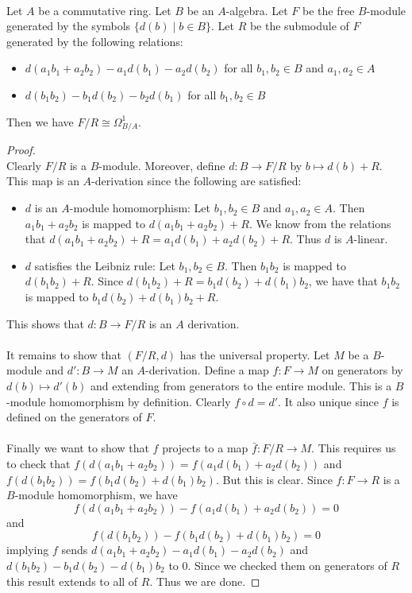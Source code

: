 \documentclass[a4paper]{article}
\begin{document}
\begin{prp}{}{}\\
Let $A$ be a commutative ring. Let $B$ be an $A$-algebra. Let $F$ be the free $B$-module generated by the symbols $\{d(b)\;|\;b\in B\}$. Let $R$ be the submodule of $F$ generated by the following relations: 
\begin{itemize}
\item $d(a_1b_1+a_2b_2)-a_1d(b_1)-a_2d(b_2)$ for all $b_1,b_2\in B$ and $a_1,a_2\in A$
\item $d(b_1b_2)-b_1d(b_2)-b_2d(b_1)$ for all $b_1,b_2\in B$
\end{itemize}
Then we have $F/R\cong\Omega_{B/A}^1$. 
\begin{proof}\\
Clearly $F/R$ is a $B$-module. Moreover, define $d:B\to F/R$ by $b\mapsto d(b)+R$. This map is an $A$-derivation since the following are satisfied: 
\begin{itemize}
\item $d$ is an $A$-module homomorphism: Let $b_1,b_2\in B$ and $a_1,a_2\in A$. Then $a_1b_1+a_2b_2$ is mapped to $d(a_1b_1+a_2b_2)+R$. We know from the relations that $d(a_1b_1+a_2b_2)+R=a_1d(b_1)+a_2d(b_2)+R$. Thus $d$ is $A$-linear. 
\item $d$ satisfies the Leibniz rule: Let $b_1,b_2\in B$. Then $b_1b_2$ is mapped to $d(b_1b_2)+R$. Since $d(b_1b_2)+R=b_1d(b_2)+d(b_1)b_2$, we have that $b_1b_2$ is mapped to $b_1d(b_2)+d(b_1)b_2+R$. 
\end{itemize}
This shows that $d:B\to F/R$ is an $A$ derivation. \\~\\

It remains to show that $(F/R,d)$ has the universal property. Let $M$ be a $B$-module and $d':B\to M$ an $A$-derivation. Define a map $f:F\to M$ on generators by $d(b)\mapsto d'(b)$ and extending from generators to the entire module. This is a $B$-module homomorphism by definition. Clearly $f\circ d=d'$. It also unique since $f$ is defined on the generators of $F$. \\~\\

Finally we want to show that $f$ projects to a map $\bar{f}:F/R\to M$. This requires us to check that $f(d(a_1b_1+a_2b_2))=f(a_1d(b_1)+a_2d(b_2))$ and $f(d(b_1b_2))=f(b_1d(b_2)+d(b_1)b_2)$. But this is clear. Since $f:F\to R$ is a $B$-module homomorphism, we have $$f(d(a_1b_1+a_2b_2))-f(a_1d(b_1)+a_2d(b_2))=0$$ and $$f(d(b_1b_2))-f(b_1d(b_2)+d(b_1)b_2)=0$$ implying $f$ sends $d(a_1b_1+a_2b_2)-a_1d(b_1)-a_2d(b_2)$ and $d(b_1b_2)-b_1d(b_2)-d(b_1)b_2$ to $0$. Since we checked them on generators of $R$ this result extends to all of $R$. Thus we are done. 
\end{proof}
\end{prp}
\end{document}
